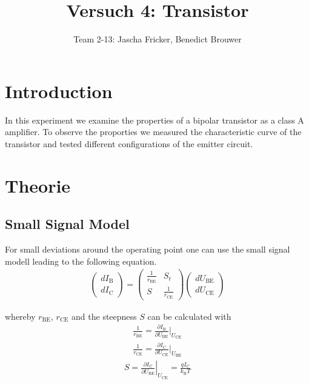 \documentclass[11pt, a4paper]{article}
\title{Versuch 4: Transistor}
\author{Team 2-13: Jascha Fricker, Benedict Brouwer}
\begin{document}
    \maketitle

    \tableofcontents

    \newpage
\section{Introduction}
In this experiment we examine the properties of a bipolar transistor as a class A amplifier. To observe the proporties we measured the characteristic curve 
of the transistor and tested different configurations of the emitter circuit.
\section{Theorie}

\subsection{Small Signal Model}
For small deviations around the operating point one can use the small signal modell leading to the following equation.
\begin{align}
\left(\begin{array}{l}
    d I_{\mathrm{B}} \\
    d I_{\mathrm{C}}
    \end{array}\right)=\left(\begin{array}{cc}
    \frac{1}{r_{\mathrm{BE}}} & S_{\mathrm{r}} \\
    S & \frac{1}{r_{\mathrm{CE}}}
    \end{array}\right)\left(\begin{array}{l}
    d U_{\mathrm{BE}} \\
    d U_{\mathrm{CE}}
    \end{array}\right)
\end{align}

whereby $r_{\text{BE}}$, $r_{\text{CE}}$ and the steepness $S$ can be calculated with
\begin{align}
    \frac{1}{r_{\text{BE}}} = \frac{\partial I_{\text{B}}}{\partial U_{\text{BE}}} |_{U_{\text{CE}}} \label{eq:rbe} 
\end{align}
\begin{align}
    \frac{1}{r_{\text{CE}}} = \frac{\partial I_{\text{C}}}{\partial U_{\text{CE}}} |_{U_{\text{BE}}} \label{eq:rce} 
\end{align}
\begin{align}
    S=\left .\frac{\partial I_{\mathrm{C}}}{\partial U_{\mathrm{BE}}}\right |_{U_{\mathrm{CE}}}=\frac{q I_{\mathrm{C}}}{k_{\mathrm{B}} T} \label{eq:steep}
\end{align}
\end{document}
